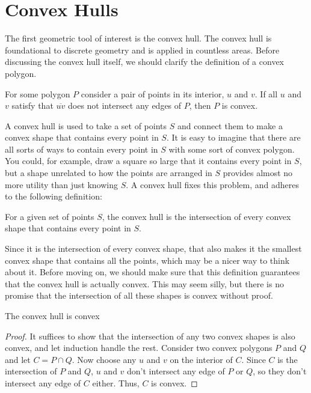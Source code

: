 \section{Convex Hulls}
The first geometric tool of interest is the convex hull.
The convex hull is foundational to discrete geometry and is applied in countless areas.
Before discussing the convex hull itself, we should clarify the definition of a convex polygon.

\begin{definition}
	For some polygon $P$ consider a pair of points in its interior, $u$ and $v$. If all $u$ and $v$ satisfy that $\overline{uv}$ does not intersect any edges of $P$, then $P$ is convex.
	\label{def:convex_polygon}
\end{definition}

A convex hull is used to take a set of points $S$ and connect them to make a convex shape that contains every point in $S$.
It is easy to imagine that there are all sorts of ways to contain every point in $S$ with some sort of convex polygon.
You could, for example, draw a square so large that it contains every point in $S$, but a shape unrelated to how the points are arranged in $S$ provides almost no more utility than just knowing $S$.
A convex hull fixes this problem, and adheres to the following definition:

\begin{definition}
	For a given set of points $S$, the convex hull is the intersection of every convex shape that contains every point in $S$.
\end{definition}

Since it is the intersection of every convex shape, that also makes it the smallest convex shape that contains all the points, which may be a nicer way to think about it.
Before moving on, we should make sure that this definition guarantees that the convex hull is actually convex.
This may seem silly, but there is no promise that the intersection of all these shapes is convex without proof.

\begin{theorem}
	The convex hull is convex
\end{theorem}

\begin{proof}
	It suffices to show that the intersection of any two convex shapes is also convex, and let induction handle the rest.
	Consider two convex polygons $P$ and $Q$ and let $C=P\cap Q$.
	Now choose any $u$ and $v$ on the interior of $C$.
	Since $C$ is the intersection of $P$ and $Q$, $u$ and $v$ don't intersect any edge of $P$ or $Q$, so they don't intersect any edge of $C$ either.
	Thus, $C$ is convex.
\end{proof}

